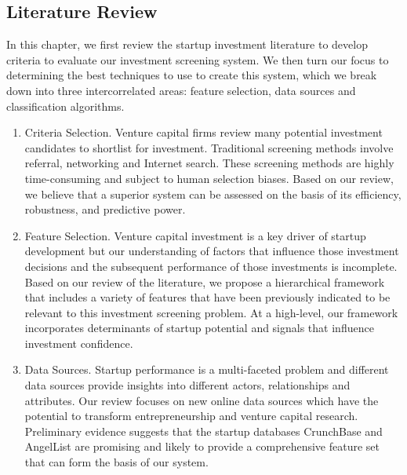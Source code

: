 \documentclass[../thesis/thesis.tex]{subfiles}
\begin{document}

\begin{refsection}


\chapter{Literature Review}\label{chap:litreview}


In this chapter, we first review the startup investment literature to develop criteria to evaluate our investment screening system. We then turn our focus to determining the best techniques to use to create this system, which we break down into three intercorrelated areas: feature selection, data sources and classification algorithms.

\begin{enumerate}

\item Criteria Selection. Venture capital firms review many potential investment candidates to shortlist for investment. Traditional screening methods involve referral, networking and Internet search. These screening methods are highly time-consuming and subject to human selection biases. Based on our review, we believe that a superior system can be assessed on the basis of its efficiency, robustness, and predictive power.

\item Feature Selection. Venture capital investment is a key driver of startup development but our understanding of factors that influence those investment decisions and the subsequent performance of those investments is incomplete. Based on our review of the literature, we propose a hierarchical framework that includes a variety of features that have been previously indicated to be relevant to this investment screening problem. At a high-level, our framework incorporates determinants of startup potential and signals that influence investment confidence.

\item Data Sources. Startup performance is a multi-faceted problem and different data sources provide insights into different actors, relationships and attributes. Our review focuses on new online data sources which have the potential to transform entrepreneurship and venture capital research. Preliminary evidence suggests that the startup databases CrunchBase and AngelList are promising and likely to provide a comprehensive feature set that can form the basis of our system.


\end{enumerate}
\end{refsection}
\end{document}
